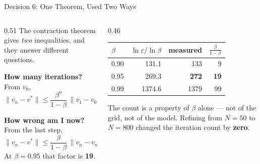 \begin{frame}{Decision 6: One Theorem, Used Two Ways}
\begin{columns}[T]
\begin{column}{0.51\textwidth}
\small
The contraction theorem gives \emph{two} inequalities, and they answer different questions.
\medskip

\textbf{How many iterations?} From $v_0$,
\[
  \lVert v_n-v^*\rVert\le\frac{\beta^{n}}{1-\beta}\,\lVert v_1-v_0\rVert
  \;\Rightarrow\; n\gtrsim\frac{\ln\varepsilon}{\ln\beta}.
\]

\textbf{How wrong am I now?} From the last step,
\[
  \lVert v_n-v^*\rVert\le\frac{\beta}{1-\beta}\,\lVert v_n-v_{n-1}\rVert .
\]
At $\beta=0.95$ that factor is \textbf{19}.
\end{column}
\begin{column}{0.46\textwidth}
\begin{center}\footnotesize
\begin{tabular}{@{}lrrr@{}}
\toprule
$\beta$ & $\ln\varepsilon/\ln\beta$ & measured & $\tfrac{\beta}{1-\beta}$ \\
\midrule
0.90 & 131.1 & 133 & 9 \\
0.95 & 269.3 & \textbf{272} & \textbf{19} \\
0.99 & 1374.6 & 1379 & 99 \\
\bottomrule
\end{tabular}
\end{center}
\vspace{1mm}
\begin{examplebox}\footnotesize
The count is a property of $\beta$ alone --- not of the grid, not of the model. Refining from $N=50$ to $N=800$ changed the iteration count by \textbf{zero}.
\end{examplebox}
\end{column}
\end{columns}
\vspace{1mm}
\end{frame}

